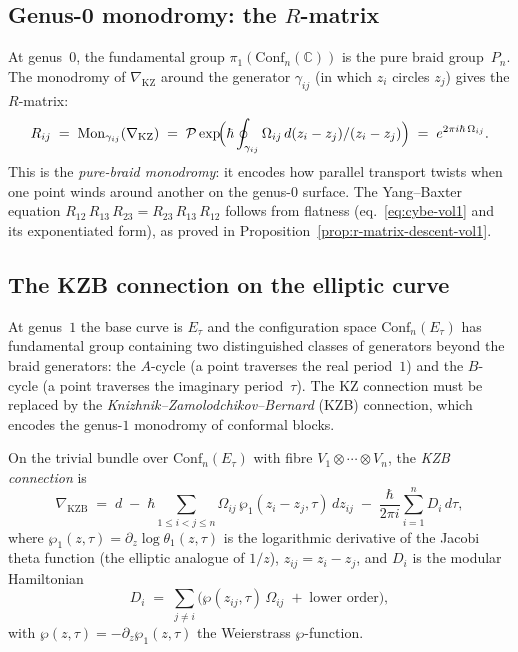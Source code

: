 \subsection{Genus-0 monodromy: the $R$-matrix}
\label{sec:genus0-monodromy}

At genus~$0$, the fundamental group
$\pi_1(\mathrm{Conf}_n(\mathbb{C}))$ is the pure braid group~$P_n$.
The monodromy of $\nabla_{\mathrm{KZ}}$ around the generator
$\gamma_{ij}$ (in which $z_i$ circles $z_j$) gives the $R$-matrix:
\[
R_{ij}
\;=\;
\operatorname{Mon}_{\gamma_{ij}}(\nabla_{\mathrm{KZ}})
\;=\;
\mathcal{P}\exp\!\Bigl(
\hbar
\oint_{\gamma_{ij}} \Omega_{ij}\,d(z_i - z_j)/(z_i - z_j)
\Bigr)
\;=\;
e^{2\pi i\hbar\,\Omega_{ij}}.
\]
This is the \emph{pure-braid monodromy}: it encodes how parallel
transport twists when one point winds around another on the
genus-$0$ surface.
The Yang--Baxter equation
$R_{12}\,R_{13}\,R_{23} = R_{23}\,R_{13}\,R_{12}$
follows from flatness (eq.~\eqref{eq:cybe-vol1} and its exponentiated form),
as proved in Proposition~\ref{prop:r-matrix-descent-vol1}.

\subsection{The KZB connection on the elliptic curve}
\label{sec:kzb-connection}

At genus~$1$ the base curve is $E_\tau$ and the configuration space
$\mathrm{Conf}_n(E_\tau)$ has fundamental group containing two
distinguished classes of generators beyond the braid generators: the
$A$-cycle (a point traverses the real period~$1$) and the $B$-cycle
(a point traverses the imaginary period~$\tau$). The KZ connection
must be replaced by the \emph{Knizhnik--Zamolodchikov--Bernard} (KZB)
connection, which encodes the genus-$1$ monodromy of conformal blocks.

\begin{definition}
\ClaimStatusProvedHere
\label{def:kzb-connection}
On the trivial bundle over $\mathrm{Conf}_n(E_\tau)$ with fibre
$V_1 \otimes \cdots \otimes V_n$, the \emph{KZB connection} is
\begin{equation}\label{eq:kzb}
\nabla_{\mathrm{KZB}}
\;=\;
d
\;-\;
\hbar
\sum_{1 \leq i < j \leq n}
\Omega_{ij}\,\wp_1(z_i - z_j,\tau)\,dz_{ij}
\;-\;
\frac{\hbar}{2\pi i}
\sum_{i=1}^n
D_i\,d\tau,
\end{equation}
where $\wp_1(z,\tau) = \partial_z \log\theta_1(z,\tau)$ is the
logarithmic derivative of the Jacobi theta function (the elliptic
analogue of $1/z$), $z_{ij} = z_i - z_j$, and $D_i$ is the modular
Hamiltonian
\[
D_i
\;=\;
\sum_{j \neq i}
\bigl(
\wp(z_{ij},\tau)\,\Omega_{ij}
\;+\;
\text{lower order}
\bigr),
\]
with $\wp(z,\tau) = -\partial_z \wp_1(z,\tau)$ the Weierstrass
$\wp$-function.
\end{definition}

